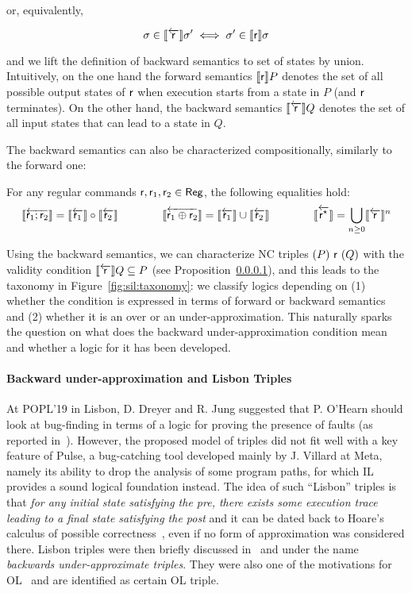 \noindent or, equivalently,

\begin{equation}
	\sigma \in \llbracket\overleftarrow{\mathsf{r}}\rrbracket \sigma' \iff \sigma' \in \llbracket\mathsf{r}\rrbracket \sigma  \label{eq:sil:bwsem-sigma-sigma'}
\end{equation}

\noindent and we lift the definition of backward semantics to set of states by union.
Intuitively, on the one hand the forward semantics $\llbracket\mathsf{r}\rrbracket P$ denotes the set of all possible output states of $\mathsf{r}$ when execution starts from a state in $P$ (and $\mathsf{r}$ terminates).
On the other hand, the backward semantics $\llbracket\overleftarrow{\mathsf{r}}\rrbracket Q$ denotes the set of all input states that can lead to a state in $Q$.

The backward semantics can also be characterized compositionally, similarly to the forward one:

\begin{lemma}\label{lmm:sil:bwsem-calculus}
	For any regular commands $\mathsf{r},\mathsf{r}_1,\mathsf{r}_2\in \mathsf{Reg}$, the following equalities hold:
	\[
	\llbracket\overleftarrow{\mathsf{r}_1; \mathsf{r}_2}\rrbracket = \llbracket\overleftarrow{\mathsf{r}_1}\rrbracket \circ \llbracket\overleftarrow{\mathsf{r}_2}\rrbracket \qquad\qquad
	\llbracket\overleftarrow{\mathsf{r}_1 \oplus \mathsf{r}_2}\rrbracket = \llbracket\overleftarrow{\mathsf{r}_1}\rrbracket \cup \llbracket\overleftarrow{\mathsf{r}_2}\rrbracket \qquad\qquad
	\llbracket\overleftarrow{{\mathsf{r}^\star}}\rrbracket = \bigcup\limits_{n \ge 0} \llbracket\overleftarrow{\mathsf{r}}\rrbracket^n
	\]
\end{lemma}

Using the backward semantics, we can characterize NC triples $(P)~\mathsf{r}~(Q)$ with the validity condition $\llbracket\overleftarrow{\mathsf{r}}\rrbracket Q \subseteq P$ (see Proposition~\ref{}), and this leads to the taxonomy in Figure~\ref{fig:sil:taxonomy}: we classify logics depending on (1) whether the condition is expressed in terms of forward or backward semantics and (2) whether it is an over or an under-approximation.
This naturally sparks the question on what does the backward under-approximation condition mean and whether a logic for it has been developed.


\paragraph{Backward under-approximation and Lisbon Triples}
At POPL'19 in Lisbon, D. Dreyer and R. Jung suggested that P. O'Hearn should look at bug-finding in terms of a logic for proving the presence of faults (as reported in~\cite{OHearn20,ZDS23}).
However, the proposed model of triples did not fit well with a key feature of Pulse, a bug-catching tool developed mainly by J. Villard at Meta, namely its ability to drop the analysis of some program paths, for which IL provides a sound logical foundation instead.
The idea of such ``Lisbon'' triples is that \emph{for any initial state satisfying the pre, there exists some execution trace leading to a final state satisfying the post} and it can be dated back to Hoare's calculus of possible correctness~\cite{Hoare78}, even if no form of approximation was considered there.
Lisbon triples were then briefly discussed in~\cite[\S 5]{MOH21} and \cite[\S 3.2]{LRVBDO22} under the name \emph{backwards under-approximate triples}. They were also one of the motivations for OL~\cite{ZDS23} and are identified as certain OL triple.

